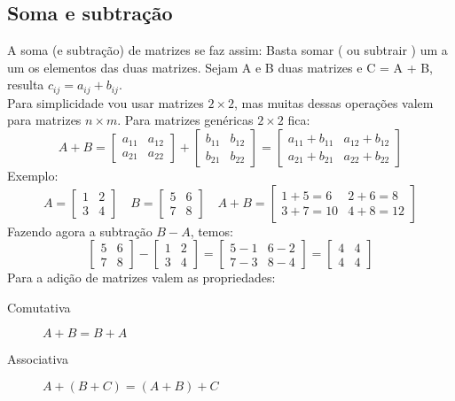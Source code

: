 \subsection{Soma e subtração}
A soma (e subtração) de matrizes se faz assim: Basta somar ( ou subtrair ) um a um os elementos das duas matrizes.
Sejam A e B duas matrizes e C = A + B, resulta $c_{ij}=a_{ij}+b_{ij}$.\\
Para simplicidade vou usar matrizes $2 \times 2$, mas muitas dessas operações valem para matrizes $n \times m$. Para matrizes genéricas $2 \times 2$ fica:
\begin{displaymath}
  A+B=
  \begin{bmatrix}
  a_{11} & a_{12}\\a_{21} & a_{22}  
  \end{bmatrix}
  +
  \begin{bmatrix}
  b_{11} & b_{12}\\b_{21} & b_{22}  
  \end{bmatrix}
  =
  \begin{bmatrix}
  a_{11}+b_{11} & a_{12}+b_{12}\\a_{21}+b_{21} & a_{22}+b_{22}  
  \end{bmatrix}
\end{displaymath}
Exemplo:
\begin{displaymath}
A=
\begin{bmatrix}
  1 & 2 \\ 3 & 4
\end{bmatrix}
 \quad B=\begin{bmatrix}
 5 & 6 \\ 7 & 8 \end{bmatrix}
\quad A + B =
\begin{bmatrix}
  1+5=6 & 2+6=8\\
  3+7=10 & 4+8=12
  \end{bmatrix}
\end{displaymath}
Fazendo agora a subtração $ B-A $, temos:
\begin{displaymath}
\begin{bmatrix}
5 & 6 \\
7 & 8
\end{bmatrix}
-
\begin{bmatrix}
1 & 2 \\ 
3 & 4
\end{bmatrix}
=
\begin{bmatrix}
5-1 & 6-2 \\ 
7-3 & 8-4
\end{bmatrix}
=
\begin{bmatrix}
4 & 4 \\ 
4 & 4
\end{bmatrix} 
\end{displaymath}
Para a adição de matrizes valem as propriedades:
\begin{description}
\item[Comutativa] $A+B=B+A$
\item[Associativa]$ A+(B+C)=(A+B)+C $
\end{description}

